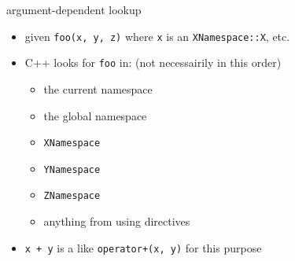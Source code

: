\begin{frame}{argument-dependent lookup}
    \begin{itemize}
        \item given {\tt foo(x, y, z)} where {\tt x} is an {\tt XNamespace::X}, etc.
        \item C++ looks for {\tt foo} in: (not necessairily in this order)
            \begin{itemize}
            \item the current namespace
            \item the global namespace
            \item {\tt XNamespace}
            \item {\tt YNamespace}
            \item {\tt ZNamespace}
            \item anything from using directives
            \end{itemize}
        \item {\tt x + y} is a like {\tt operator+(x, y)} for this purpose
    \end{itemize}
\end{frame}
